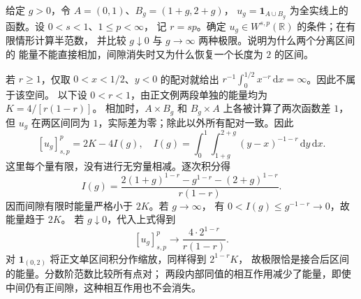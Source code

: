 \begin{exercise}\label{b1:ex:23-interval-characteristic}
给定 \(g>0\)，令 \(A=(0,1)\)、\(B_g=(1+g,2+g)\)，
\(u_g=\mathbf1_{A\cup B_g}\) 为全实线上的函数。设 \(0<s<1\)、\(1\le p<\infty\)，
记 \(r=sp\)。确定 \(u_g\in W^{s,p}(\mathbb R)\) 的条件；在有限情形计算半范数，
并比较 \(g\downarrow0\) 与 \(g\to\infty\) 两种极限。说明为什么两个分离区间的
能量不能直接相加，间隙消失时又为什么恢复一个长度为 \(2\) 的区间。
\end{exercise}
\begin{solution}
若 \(r\ge1\)，仅取 \(0<x<1/2\)、\(y<0\) 的配对就给出
\(r^{-1}\int_0^{1/2}x^{-r}\,\mathrm dx=\infty\)。因此不属于该空间。
以下设 \(0<r<1\)，由正文例两段单独的能量均为 \(K=4/[r(1-r)]\)。
相加时，\(A\times B_g\) 和 \(B_g\times A\) 上各被计算了两次函数差 \(1\)，
但 \(u_g\) 在两区间同为 \(1\)，实际差为零；除此以外所有配对一致。因此
\[
 [u_g]_{s,p}^p=2K-4I(g),\quad
 I(g)=\int_0^1\int_{1+g}^{2+g}(y-x)^{-1-r}\,\mathrm dy\,\mathrm dx.
\]
这里每个量有限，没有进行无穷量相减。逐次积分得
\[
 I(g)=\frac{2(1+g)^{1-r}-g^{1-r}-(2+g)^{1-r}}{r(1-r)}.
\]
因而间隙有限时能量严格小于 \(2K\)。若 \(g\to\infty\)，
有 \(0<I(g)\le g^{-1-r}\to0\)，故能量趋于 \(2K\)。
若 \(g\downarrow0\)，代入上式得到
\[
 [u_g]_{s,p}^p\longrightarrow\frac{4\cdot2^{1-r}}{r(1-r)}.
\]
对 \(\mathbf1_{(0,2)}\) 将正文单区间积分作缩放，同样得到 \(2^{1-r}K\)，
故极限恰是接合后区间的能量。分数阶范数比较所有点对；
两段内部同值的相互作用减少了能量，即使中间仍有正间隙，这种相互作用也不会消失。
\end{solution}

